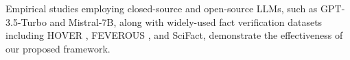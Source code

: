 
Empirical studies employing closed-source and open-source LLMs, such as GPT-3.5-Turbo and Mistral-7B, along with widely-used fact verification datasets including HOVER \cite{jiang2020hover}, FEVEROUS \cite{aly2021feverous}, and SciFact\cite{wadden2020fact}, demonstrate the effectiveness of our proposed framework. 

